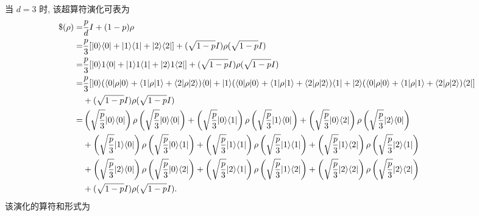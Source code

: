 \documentclass{assignment}
\begin{document}
\begin{sol}
    当 $d=3$ 时, 该超算符演化可表为
    \begin{align}
        \notag\$(\rho)=&\frac{p}{d}I+(1-p)\rho\\
        \notag=&\frac{p}{3}[\lvert 0\rangle\langle 0\rvert+\lvert 1\rangle\langle 1\rvert+\lvert 2\rangle\langle 2\rvert]+(\sqrt{1-p}I)\rho(\sqrt{1-p}I)\\
        \notag=&\frac{p}{3}[\lvert 0\rangle 1\langle 0\rvert+\lvert 1\rangle 1\langle 1\rvert+\lvert 2\rangle 1\langle 2\rvert]+(\sqrt{1-p}I)\rho(\sqrt{1-p}I)\\
        \notag=&\frac{p}{3}[\lvert 0\rangle(\langle 0\rvert\rho\lvert 0\rangle+\langle 1\rvert\rho\lvert 1\rangle+\langle 2\rvert\rho\lvert 2\rangle)\langle 0\rvert+\lvert 1\rangle(\langle 0\rvert\rho\lvert 0\rangle+\langle 1\rvert\rho\lvert 1\rangle+\langle 2\rvert\rho\lvert 2\rangle)\langle 1\rvert+\lvert 2\rangle(\langle 0\rvert\rho\lvert 0\rangle+\langle 1\rvert\rho\lvert 1\rangle+\langle 2\rvert\rho\lvert 2\rangle)\langle 2\rvert]\\
        \notag&+(\sqrt{1-p}I)\rho(\sqrt{1-p}I)\\
        \notag=&\left(\sqrt{\frac{p}{3}}\lvert 0\rangle\langle 0\rvert\right)\rho\left(\sqrt{\frac{p}{3}}\lvert 0\rangle\langle 0\rvert\right)+\left(\sqrt{\frac{p}{3}}\lvert 0\rangle\langle 1\rvert\right)\rho\left(\sqrt{\frac{p}{3}}\lvert 1\rangle\langle 0\rvert\right)+\left(\sqrt{\frac{p}{3}}\lvert 0\rangle\langle 2\rvert\right)\rho\left(\sqrt{\frac{p}{3}}\lvert 2\rangle\langle 0\rvert\right)\\
        \notag&+\left(\sqrt{\frac{p}{3}}\lvert 1\rangle\langle 0\rvert\right)\rho\left(\sqrt{\frac{p}{3}}\lvert 0\rangle\langle 1\rvert\right)+\left(\sqrt{\frac{p}{3}}\lvert 1\rangle\langle 1\rvert\right)\rho\left(\sqrt{\frac{p}{3}}\lvert 1\rangle\langle 1\rvert\right)+\left(\sqrt{\frac{p}{3}}\lvert 1\rangle\langle 2\rvert\right)\rho\left(\sqrt{\frac{p}{3}}\lvert 2\rangle\langle 1\rvert\right)\\
        \notag&+\left(\sqrt{\frac{p}{3}}\lvert 2\rangle\langle 0\rvert\right)\rho\left(\sqrt{\frac{p}{3}}\lvert 0\rangle\langle 2\rvert\right)+\left(\sqrt{\frac{p}{3}}\lvert 2\rangle\langle 1\rvert\right)\rho\left(\sqrt{\frac{p}{3}}\lvert 1\rangle\langle 2\rvert\right)+\left(\sqrt{\frac{p}{3}}\lvert 2\rangle\langle 2\rvert\right)\rho\left(\sqrt{\frac{p}{3}}\lvert 2\rangle\langle 2\rvert\right)\\
        \notag&+(\sqrt{1-p}I)\rho(\sqrt{1-p}I).
    \end{align}
    该演化的算符和形式为
    \begin{align}

\end{align}
\end{sol}
\end{document}
